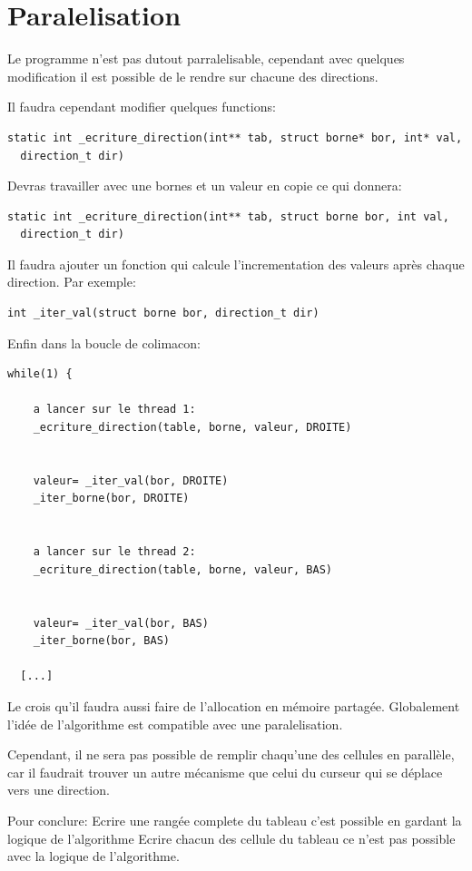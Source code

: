 \documentclass[a4paper]{article}
\begin{document}
\section{Paralelisation}

Le programme n'est pas dutout parralelisable, cependant avec quelques
modification il est possible de le rendre sur chacune des directions.

Il faudra cependant modifier quelques functions:
\begin{lstlisting}[frame=single]
static int _ecriture_direction(int** tab, struct borne* bor, int* val,
  direction_t dir)
\end{lstlisting}
Devras travailler avec une bornes et un valeur en copie ce qui donnera:
\begin{lstlisting}[frame=single]
static int _ecriture_direction(int** tab, struct borne bor, int val,
  direction_t dir)
\end{lstlisting}

Il faudra ajouter un fonction qui calcule l'incrementation des valeurs après
chaque direction. Par exemple:
\begin{lstlisting}[frame=single]
int _iter_val(struct borne bor, direction_t dir)
\end{lstlisting}

Enfin dans la boucle de colimacon:

\begin{lstlisting}[frame=single]
  while(1) {

    a lancer sur le thread 1:
    _ecriture_direction(table, borne, valeur, DROITE)


    valeur= _iter_val(bor, DROITE)
    _iter_borne(bor, DROITE)


    a lancer sur le thread 2:
    _ecriture_direction(table, borne, valeur, BAS)


    valeur= _iter_val(bor, BAS)
    _iter_borne(bor, BAS)

  [...]
\end{lstlisting}

Le crois qu'il faudra aussi faire de l'allocation en mémoire partagée.
Globalement l'idée de l'algorithme est compatible avec une paralelisation.

Cependant, il ne sera pas possible de remplir chaqu'une des cellules en
parallèle, car il faudrait trouver un autre mécanisme que celui du curseur
qui se déplace vers une direction.

Pour conclure:
Ecrire une rangée complete du tableau c'est possible en
gardant la logique de l'algorithme
Ecrire chacun des cellule du tableau ce n'est pas possible avec la logique de
l'algorithme.





\end{document}
